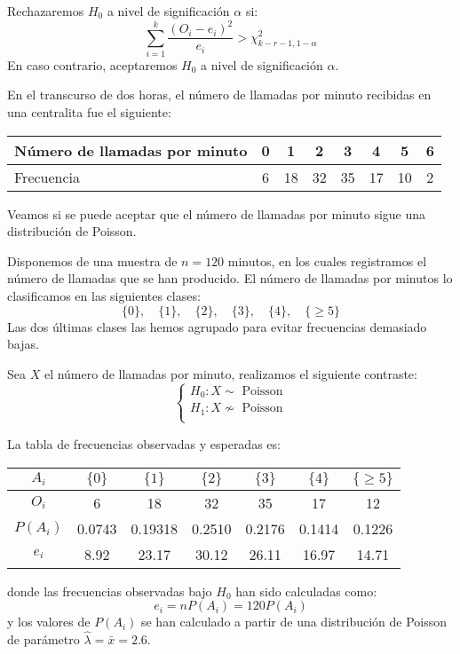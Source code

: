 Rechazaremos $H_0$ a nivel de significación $\alpha$ si:
$$\sum_{i=1}^k \frac{(O_i-e_i)^2}{e_i} > \chi^2_{k-r-1, 1-\alpha}$$
En caso contrario, aceptaremos $H_0$ a nivel de significación $\alpha$.

\begin{example}
    En el transcurso de dos horas, el número de llamadas por minuto recibidas en una centralita fue el siguiente:
    \begin{center}
        \begin{tabular}{| l | c c c c c c c |}
            \hline
            Número de llamadas por minuto & 0 & 1  & 2  & 3  & 4  & 5  & 6 \\
            \hline
            Frecuencia                    & 6 & 18 & 32 & 35 & 17 & 10 & 2 \\
            \hline
        \end{tabular}
    \end{center}
    Veamos si se puede aceptar que el número de llamadas por minuto sigue una distribución de Poisson.

    Disponemos de una muestra de $n = 120$ minutos, en los cuales registramos el número de llamadas que se han producido.
    El número de llamadas por minutos lo clasificamos en las siguientes clases:
    $$\{0\}, \quad \{1\}, \quad \{2\}, \quad \{3\}, \quad \{4\}, \quad \{\geq 5\}$$
    Las dos últimas clases las hemos agrupado para evitar frecuencias demasiado bajas.

    Sea $X$ el número de llamadas por minuto, realizamos el siguiente contraste:
    $$\begin{cases}
            H_0: X \sim \text{ Poisson}  \\
            H_1: X \nsim \text{ Poisson} \\
        \end{cases}$$

    La tabla de frecuencias observadas y esperadas es:
    \begin{center}
        \begin{tabular}{| c | c c c c c c |}
            \hline
            $A_i$    & $\{0\}$ & $\{1\}$ & $\{2\}$ & $\{3\}$ & $\{4\}$ & $\{\geq 5\}$ \\
            \hline
            $O_i$    & 6       & 18      & 32      & 35      & 17      & 12           \\
            $P(A_i)$ & 0.0743  & 0.19318 & 0.2510  & 0.2176  & 0.1414  & 0.1226       \\
            $e_i$    & 8.92    & 23.17   & 30.12   & 26.11   & 16.97   & 14.71        \\
            \hline
        \end{tabular}
    \end{center}
    donde las frecuencias observadas bajo $H_0$ han sido calculadas como:
    $$e_i = nP(A_i) = 120P(A_i)$$
    y los valores de $P(A_i)$ se han calculado a partir de una distribución de Poisson de parámetro $\hat{\lambda} = \bar{x} = 2.6$.


\end{example}
